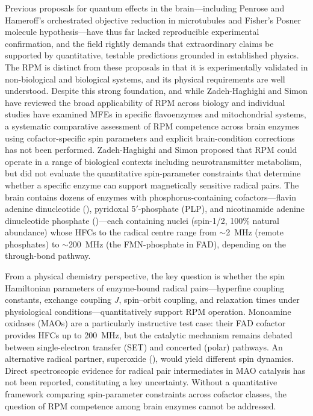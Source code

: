 \documentclass[twoside,twocolumn,9pt]{article}
\begin{document}
Previous proposals for quantum effects in the brain---including Penrose and Hameroff's orchestrated objective reduction in microtubules and Fisher's Posner molecule hypothesis\cite{Fisher2015}---have thus far lacked reproducible experimental confirmation, and the field rightly demands that extraordinary claims be supported by quantitative, testable predictions grounded in established physics.\cite{Cao2020} The RPM is distinct from these proposals in that it is experimentally validated in non-biological\cite{Steiner1989} and biological\cite{Xu2021} systems, and its physical requirements are well understood. Despite this strong foundation, and while Zadeh-Haghighi and Simon\cite{ZadehHaghighi2022} have reviewed the broad applicability of RPM across biology and individual studies have examined MFEs in specific flavoenzymes\cite{Maeda2012,Jones2009} and mitochondrial systems,\cite{Usselman2016} a systematic comparative assessment of RPM competence across brain enzymes using cofactor-specific spin parameters and explicit brain-condition corrections has not been performed. Zadeh-Haghighi and Simon\cite{ZadehHaghighi2022} proposed that RPM could operate in a range of biological contexts including neurotransmitter metabolism, but did not evaluate the quantitative spin-parameter constraints that determine whether a specific enzyme can support magnetically sensitive radical pairs. The brain contains dozens of enzymes with phosphorus-containing cofactors---flavin adenine dinucleotide (), pyridoxal 5$'$-phosphate (PLP), and nicotinamide adenine dinucleotide phosphate ()---each containing  nuclei (spin-1/2, 100\% natural abundance) whose HFCs to the radical centre range from $\sim$2~MHz (remote phosphates) to $\sim$200~MHz (the FMN-phosphate in FAD\cite{Weber1998}), depending on the through-bond pathway.

From a physical chemistry perspective, the key question is whether the spin Hamiltonian parameters of enzyme-bound radical pairs---hyperfine coupling constants, exchange coupling $J$, spin--orbit coupling, and relaxation times under physiological conditions---quantitatively support RPM operation. Monoamine oxidases (MAOs) are a particularly instructive test case: their FAD cofactor provides  HFCs up to 200~MHz,\cite{Weber1998} but the catalytic mechanism remains debated between single-electron transfer (SET)\cite{Ramsay1991} and concerted (polar) pathways. An alternative radical partner, superoxide (),\cite{Player2019} would yield different spin dynamics. Direct spectroscopic evidence for radical pair intermediates in MAO catalysis has not been reported, constituting a key uncertainty. Without a quantitative framework comparing spin-parameter constraints across cofactor classes, the question of RPM competence among brain enzymes cannot be addressed.
\end{document}
